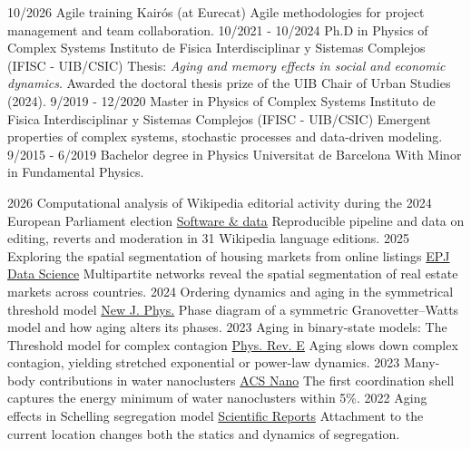 \documentclass[9pt]{developercv} %
\begin{document}
\vspace{-10 pt}
\begin{entrylist}
    \entry
		{10/2026}
		{Agile training}
		{Kairós (at Eurecat)}
		{Agile methodologies for project management and team collaboration.}
    \entry
		{10/2021 - 10/2024}
		{Ph.D in Physics of Complex Systems}
		{Instituto de Fisica Interdisciplinar y Sistemas Complejos (IFISC - UIB/CSIC)}
		{Thesis: \textit{Aging and memory effects in social and economic dynamics}. Awarded the doctoral thesis prize of the UIB Chair of Urban Studies (2024).}
    \entry
		{9/2019 - 12/2020}
		{Master in Physics of Complex Systems}
		{Instituto de Fisica Interdisciplinar y Sistemas Complejos (IFISC - UIB/CSIC)}
		{Emergent properties of complex systems, stochastic processes and data-driven modeling.}
    \entry
		{9/2015 - 6/2019}
		{Bachelor degree in Physics}
		{Universitat de Barcelona}
		{With Minor in Fundamental Physics.}
\end{entrylist}
\vspace{-0.4 cm}


\begin{entrylist}
    \entry
		{2026}
		{Computational analysis of Wikipedia editorial activity during the 2024 European Parliament election}
		{{\href{https://zenodo.org/records/22111198}{Software \& data}}}
		{Reproducible pipeline and data on editing, reverts and moderation in 31 Wikipedia language editions.}
    \entry
		{2025}
		{Exploring the spatial segmentation of housing markets from online listings}
		{{\href{https://doi.org/10.1140/epjds/s13688-025-00551-z}{EPJ Data Science}}}
		{Multipartite networks reveal the spatial segmentation of real estate markets across countries.}
    \entry
		{2024}
		{Ordering dynamics and aging in the symmetrical threshold model}
		{{\href{https://doi.org/10.1088/1367-2630/ad1ad4}{New J. Phys.}}}
		{Phase diagram of a symmetric Granovetter–Watts model and how aging alters its phases.}
\entry
		{2023}
		{Aging in binary-state models: The Threshold model for complex contagion}
		{{\href{https://doi.org/10.1103/PhysRevE.107.024101}{Phys. Rev. E}}}
		{Aging slows down complex contagion, yielding stretched exponential or power-law dynamics.}
    \entry
		{2023}
		{Many-body contributions in water nanoclusters}
		{{\href{https://doi.org/10.1021/acsnano.2c06077}{ACS Nano}}}
		{The first coordination shell captures the energy minimum of water nanoclusters within 5$\%$.}
    \entry
		{2022}
		{Aging effects in Schelling segregation model}
		{{\href{https://doi.org/10.1038/s41598-022-23224-7}{Scientific Reports}}}
		{Attachment to the current location changes both the statics and dynamics of segregation.}
\end{entrylist}
\vspace{-1 cm}
\end{document}
